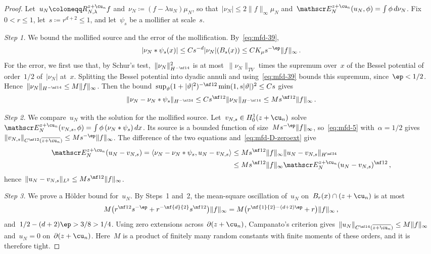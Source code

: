 \documentclass[11pt]{amsart}
\begin{document}
\begin{proof}
Let~$u_N\coloneqq R^{z+\cu_n}_{N,\lambda}f$ and~$\nu_N\coloneqq(f-\lambda u_N)\mu_N$, so that~$|\nu_N|\leq2\|f\|_\infty\mu_N$ and~$\mathscr E_N^{z+\cu_n}(u_N,\phi)=\int\phi\,d\nu_N$. Fix~$0<r\leq1$, let~$s\coloneqq r^{d+2}\leq1$, and let~$\psi_s$ be a mollifier at scale~$s$.

\smallskip

\emph{Step 1.} We bound the mollified source and the error of the mollification. By~\eqref{eq:mfd-39},
\begin{equation*}
	|\nu_N*\psi_s(x)|\leq Cs^{-d}|\nu_N|(B_s(x))\leq CK_\mu s^{-\ep}\|f\|_\infty\,.
\end{equation*}
For the error, we first use that, by Schur's test,~$\|\nu_N\|_{H^{-\nf14}}^2$ is at most~$\|\nu_N\|_{TV}$ times the supremum over~$x$ of the Bessel potential of order~$1/2$ of~$|\nu_N|$ at~$x$. Splitting the Bessel potential into dyadic annuli and using~\eqref{eq:mfd-39} bounds this supremum, since~$\ep<1/2$. Hence~$\|\nu_N\|_{H^{-\nf14}}\leq M\|f\|_\infty$. Then the bound~$\sup_\vartheta(1+|\vartheta|^2)^{-\nf12}\min(1,s|\vartheta|)^2\leq Cs$ gives
\begin{equation*}
	\|\nu_N-\nu_N*\psi_s\|_{H^{-\nf34}}\leq Cs^{\nf12}\|\nu_N\|_{H^{-\nf14}}
	\leq Ms^{\nf12}\|f\|_\infty\,.
\end{equation*}

\smallskip

\emph{Step 2.} We compare~$u_N$ with the solution for the mollified source. Let~$v_{N,s}\in H^1_0(z+\cu_n)$ solve~$\mathscr E_N^{z+\cu_n}(v_{N,s},\phi)=\int\phi\,(\nu_N*\psi_s)\,dx$. Its source is a bounded function of size~$Ms^{-\ep}\|f\|_\infty$, so~\eqref{eq:mfd-5} with~$\alpha=1/2$ gives~$\|v_{N,s}\|_{C^{\nf12}(\overline{z+\cu_n})}\leq Ms^{-\ep}\|f\|_\infty$. The difference of the two equations and~\eqref{eq:mfd-D-zeroext} give
\begin{align*}
	\mathscr E_N^{z+\cu_n}(u_N-v_{N,s})=\langle\nu_N-\nu_N*\psi_s,u_N-v_{N,s}\rangle
	&
	\leq Ms^{\nf12}\|f\|_\infty\|u_N-v_{N,s}\|_{H^{\nf34}}
	\notag \\ &
	\leq Ms^{\nf12}\|f\|_\infty \mathscr E_N^{z+\cu_n}(u_N-v_{N,s})^{\nf12}\,,
\end{align*}
hence~$\|u_N-v_{N,s}\|_{L^2}\leq Ms^{\nf12}\|f\|_\infty$.

\smallskip

\emph{Step 3.} We prove a H\"older bound for~$u_N$. By Steps~1 and~2, the mean-square oscillation of~$u_N$ on~$B_r(x)\cap(z+\cu_n)$ is at most
\begin{equation*}
	M\bigl(r^{\nf12}s^{-\ep}+r^{-\nf{d}{2}}s^{\nf12}\bigr)\|f\|_\infty
	=M\bigl(r^{\nf{1}{2}-(d+2)\ep}+r\bigr)\|f\|_\infty\,,
\end{equation*}
and~$1/2-(d+2)\ep>3/8>1/4$. Using zero extensions across~$\partial(z+\cu_n)$, Campanato's criterion gives~$\|u_N\|_{C^{\nf14}(\overline{z+\cu_n})}\leq M\|f\|_\infty$ and~$u_N=0$ on~$\partial(z+\cu_n)$. Here~$M$ is a product of finitely many random constants with finite moments of these orders, and it is therefore tight.


\end{proof}
\end{document}
